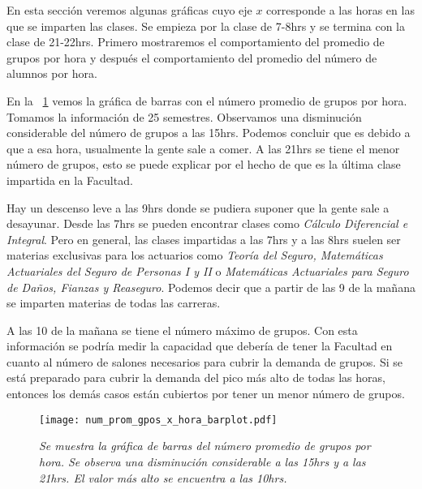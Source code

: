 En esta sección veremos algunas gráficas cuyo eje $x$ corresponde a las horas en las que se imparten las clases. Se empieza por la clase de 7-8hrs y se termina con la clase de 21-22hrs. Primero mostraremos el comportamiento del promedio de grupos por hora y después el comportamiento del promedio del número de alumnos por hora.

En la \figurename{~\ref{num_prom_gpos_x_hora_barplot}} vemos la gráfica de barras con el número promedio de grupos por hora. Tomamos la información de 25 semestres. Observamos una disminución considerable del número de grupos a las 15hrs. Podemos concluir que es debido a que a esa hora, usualmente la gente sale a comer. A las 21hrs se tiene el menor número de grupos, esto se puede explicar por el hecho de que es la última clase impartida en la Facultad.

Hay un descenso leve a las 9hrs donde se pudiera suponer que la gente sale a desayunar. Desde las 7hrs se pueden encontrar clases como \textit{Cálculo Diferencial e Integral}. Pero en general, las clases impartidas a las 7hrs y a las 8hrs suelen ser materias exclusivas para los actuarios como \textit{Teoría del Seguro, Matemáticas Actuariales del Seguro de Personas I y II} o \textit{Matemáticas Actuariales para Seguro de Daños, Fianzas y Reaseguro}. Podemos decir que a partir de las 9 de la mañana se imparten materias de todas las carreras.


A las 10 de la mañana se tiene el número máximo de grupos. Con esta información se podría medir la capacidad que debería de tener la Facultad en cuanto al número de salones necesarios para cubrir la demanda de grupos. Si se está preparado para cubrir la demanda del pico más alto de todas las horas, entonces los demás casos están cubiertos por tener un menor número de grupos.


\begin{figure}[h]
\centering
\texttt{[image: num\_prom\_gpos\_x\_hora\_barplot.pdf]} %
\caption[\textit{Número promedio de grupos por hora}]{\textit{Se muestra la gráfica de barras del número promedio de grupos por hora. Se observa una disminución considerable a las 15hrs y a las 21hrs. El valor más alto se encuentra a las 10hrs.}}\label{num_prom_gpos_x_hora_barplot}
\end{figure}

